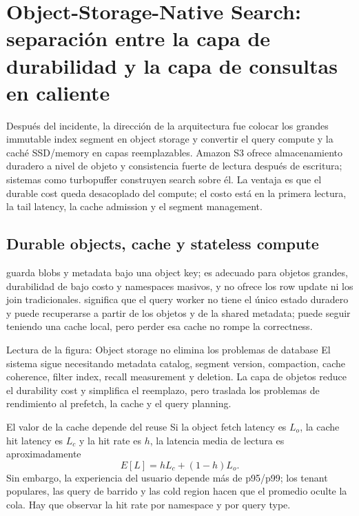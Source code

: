 \section{Object-Storage-Native Search: separación entre la capa de durabilidad y la capa de consultas en caliente}

Después del incidente, la dirección de la arquitectura fue colocar los grandes immutable index segment en object storage y convertir el query compute y la caché SSD/memory en capas reemplazables. Amazon S3 ofrece almacenamiento duradero a nivel de objeto y consistencia fuerte de lectura después de escritura; sistemas como turbopuffer construyen search sobre él. La ventaja es que el durable cost queda desacoplado del compute; el costo está en la primera lectura, la tail latency, la cache admission y el segment management.

\subsection{Durable objects, cache y stateless compute}

 guarda blobs y metadata bajo una object key; es adecuado para objetos grandes, durabilidad de bajo costo y namespaces masivos, y no ofrece los row update ni los join tradicionales.  significa que el query worker no tiene el único estado duradero y puede recuperarse a partir de los objetos y de la shared metadata; puede seguir teniendo una cache local, pero perder esa cache no rompe la correctness.


\begin{knowledgebox}{Lectura de la figura: Object storage no elimina los problemas de database}
El sistema sigue necesitando metadata catalog, segment version, compaction, cache coherence, filter index, recall measurement y deletion. La capa de objetos reduce el durability cost y simplifica el reemplazo, pero traslada los problemas de rendimiento al prefetch, la cache y el query planning.
\end{knowledgebox}

\begin{importantbox}{El valor de la cache depende del reuse}
Si la object fetch latency es $L_o$, la cache hit latency es $L_c$ y la hit rate es $h$, la latencia media de lectura es aproximadamente
\[
E[L]=hL_c+(1-h)L_o.
\]
Sin embargo, la experiencia del usuario depende más de p95/p99; los tenant populares, las query de barrido y las cold region hacen que el promedio oculte la cola. Hay que observar la hit rate por namespace y por query type.
\end{importantbox}

